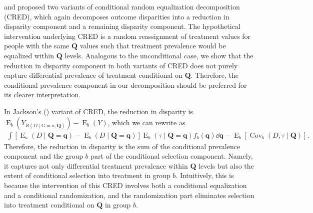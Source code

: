 \documentclass[12pt,a4paper]{article}
\newcommand{\Cov}{\operatorname{Cov}}
\newcommand{\E}{\operatorname{E}}
\def\Q{{\boldsymbol Q}}
\def\q{{\boldsymbol q}}
\begin{document}
\citet{jackson_meaningful_2021} and \citet{lundberg_gap-closing_2022} proposed two variants of conditional random equalization decomposition (CRED), which again decomposes outcome disparities into a reduction in disparity component and a remaining disparity component. The hypothetical intervention underlying CRED is a random reassignment of treatment values for people with the same $\Q$ values such that treatment prevalence would be equalized within $\Q$ levels. Analogous to the unconditional case, we show that the reduction in disparity component in both variants of CRED does not purely capture differential prevalence of treatment conditional on $\Q$. Therefore, the conditional prevalence component in our decomposition should be preferred for its clearer interpretation. 

In Jackson's (\citeyear{jackson_meaningful_2021}) variant of CRED, the reduction in disparity is $\E_b(Y_{R(D \mid G=a, \Q)})-\E_b(Y)$, which we can rewrite as 
\begin{gather}
\int  [\E_a(D \mid \Q=\q) - \E_b(D \mid \Q=\q)] \E_b(\tau \mid \Q=\q) f_b(\q) \dd \q - \E_b[\Cov_b(D, \tau \mid \Q)]. 
\end{gather}
Therefore, the reduction in disparity is the sum of the conditional prevalence component and the group $b$ part of the conditional selection component. Namely, it captures not only differential treatment prevalence within $\Q$ levels but also the extent of conditional selection into treatment in group $b$. Intuitively, this is because the intervention of this CRED involves both a conditional equalization and a conditional randomization, and the randomization part eliminates selection into treatment conditional on $\Q$ in group $b$. 
\end{document}
